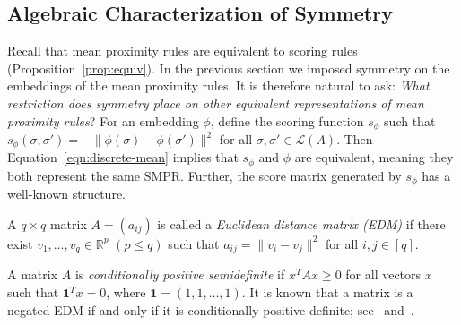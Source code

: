 \documentclass[prodmode,acmec]{ec-acmsmall}
\newcommand{\calL}{{\mathcal{L}}}
\newcommand{\rank}{{\calL(A)}}
\newcommand{\ones}{\mathbf{1}}
\begin{document}
%




\subsection{Algebraic Characterization of Symmetry}
\label{sec:smpr-char}

Recall that mean proximity rules are equivalent to scoring rules (Proposition~\ref{prop:equiv}). In the previous section we imposed symmetry on the embeddings of the mean proximity rules. It is therefore natural to ask: \emph{What restriction does symmetry place on other equivalent representations of mean proximity rules}? For an embedding $\phi$, define the scoring function $s_{\phi}$ such that $s_{\phi}(\sigma,\sigma') = -\|\phi(\sigma)-\phi(\sigma')\|^2$ for all $\sigma,\sigma' \in \rank$. Then Equation~\eqref{eqn:discrete-mean} implies that $s_{\phi}$ and $\phi$ are equivalent, meaning they both represent the same SMPR. Further, the score matrix generated by $s_{\phi}$ has a well-known structure.


\begin{definition}
A $q \times q$ matrix $A = (a_{ij})$ is called a \emph{Euclidean distance matrix (EDM)} if there exist $v_1,\ldots,v_q \in \mathbb{R}^p$ $(p \leq q)$ such that $a_{ij} = \|v_i-v_j\|^2$ for all $i,j \in [q]$. 
\end{definition}
%
A matrix $A$ is \emph{conditionally positive semidefinite} if $x^T A x \geq 0$ for all vectors $x$ such that $\ones^T x = 0$, where $\ones = (1,1,\ldots,1)$. It is known that a matrix is a negated EDM if and only if it is conditionally positive definite; see~\cite[Thm 3.10]{ikramov2000conditionally} and~\cite{schoenberg1938metric}.
\end{document}

